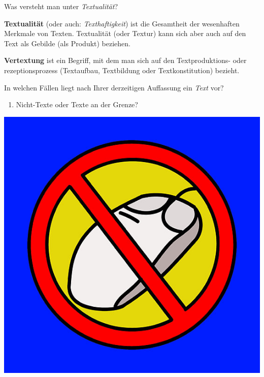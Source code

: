 \documentclass[
  letterpaper,
]{scrbook}
\providecommand{\tightlist}{%
  \setlength{\itemsep}{0pt}\setlength{\parskip}{0pt}}\usepackage{longtable,booktabs,array}
\begin{document}
Was versteht man unter \emph{Textualität}?

\textbf{Textualität} (oder auch: \emph{Texthaftigkeit}) ist die
Gesamtheit der wesenhaften Merkmale von Texten. Textualität (oder
Textur) kann sich aber auch auf den Text als Gebilde (als Produkt)
beziehen.

\textbf{Vertextung} ist ein Begriff, mit dem man sich auf den
Textproduktions- oder rezeptionsprozess (Textaufbau, Textbildung oder
Textkonstitution) bezieht.

In welchen Fällen liegt nach Ihrer derzeitigen Auffassung ein
\emph{Text} vor?

\begin{enumerate}
\def\labelenumi{(\arabic{enumi})}
\tightlist
\item
  Nicht-Texte oder Texte an der Grenze?
\end{enumerate}

\includegraphics[width=1\textwidth,height=\textheight]{./pictures/textkriterien_1.png}
\end{document}
